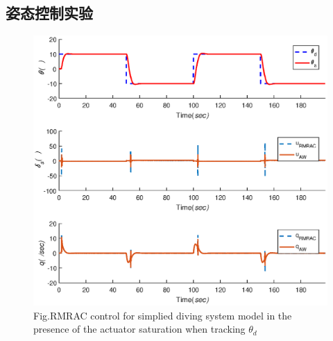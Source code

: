\subsection{姿态控制实验 }

\begin{figure}[!htp]%
\centering
\includegraphics[width=0.85\linewidth]{figure/chap6/Fig1_pulse_theta1.eps}
\label{fig:chap6:F7}
 {Fig.}{RMRAC control for simplied diving system model in the presence of the actuator saturation when tracking $\theta_{d}$}
\end{figure}

